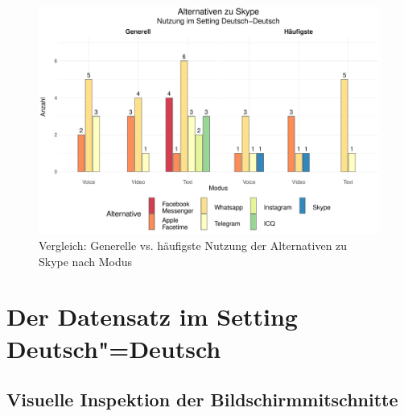 
\begin{figure}
    \includegraphics[width=\textwidth]{Figures/EingangsFB/ggplot_skype_Nutzungsvergleich_Alternativen-DeDe}
	\caption{Vergleich: Generelle vs. häufigste Nutzung der Alternativen zu Skype nach Modus}
    \label{K6:fig:NutzungsVgl-Alternativen-Modus-DD}
\end{figure}



\section{Der Datensatz im Setting Deutsch"=Deutsch}\largerpage[2]

\label{K6:sec:DatenDeDe}



\subsection{Visuelle Inspektion der Bildschirmmitschnitte}

\label{K6:sub:dede:graph-inspect}


